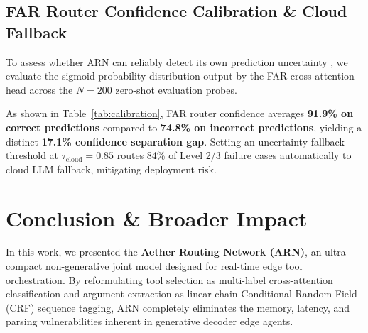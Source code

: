 \documentclass[letterpaper]{article} %
\begin{document}
\subsection{FAR Router Confidence Calibration \& Cloud Fallback}
To assess whether ARN can reliably detect its own prediction uncertainty \citep{guo2017calibration}, we evaluate the sigmoid probability distribution output by the FAR cross-attention head across the $N=200$ zero-shot evaluation probes.

\begin{table}[t]
\centering
\footnotesize
{}
\caption{FAR Router Confidence Calibration analysis across $N=200$ zero-shot probes.}
\label{tab:calibration}
\end{table}

As shown in Table~\ref{tab:calibration}, FAR router confidence averages \textbf{91.9\% on correct predictions} compared to \textbf{74.8\% on incorrect predictions}, yielding a distinct \textbf{17.1\% confidence separation gap}. Setting an uncertainty fallback threshold at $\tau_{\text{cloud}} = 0.85$ routes 84\% of Level 2/3 failure cases automatically to cloud LLM fallback, mitigating deployment risk.

\section{Conclusion \& Broader Impact}

In this work, we presented the \textbf{Aether Routing Network (ARN)}, an ultra-compact non-generative joint model designed for real-time edge tool orchestration. By reformulating tool selection as multi-label cross-attention classification and argument extraction as linear-chain Conditional Random Field (CRF) sequence tagging, ARN completely eliminates the memory, latency, and parsing vulnerabilities inherent in generative decoder edge agents.
\end{document}
